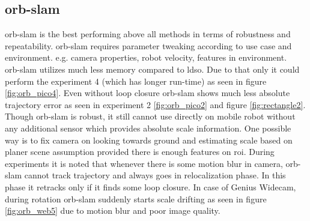 \subsection{\acrshort{orb}-\acrshort{slam}}
\acrshort{orb}-\acrshort{slam} is the best performing above all methods in terms of robustness and repeatability. \acrshort{orb}-\acrshort{slam} requires parameter tweaking according to use case and environment. e.g. camera properties, robot velocity, features in environment.\\
\newline  \acrshort{orb}-\acrshort{slam} utilizes much less memory compared to \acrshort{ldso}. Due to that only it could perform the experiment 4 (which has longer run-time) as seen in figure \ref{fig:orb_pico4}. Even without loop closure \acrshort{orb}-\acrshort{slam} shows much less absolute trajectory error as seen in experiment 2 \ref{fig:orb_pico2} and figure \ref{fig:rectangle2}.\\
\newline Though \acrshort{orb}-\acrshort{slam} is robust, it still cannot use directly on mobile robot without any additional sensor which provides absolute scale information. One possible way is to fix camera on looking towards ground and estimating scale based on planer scene assumption provided there is enough features on \acrshort{roi}. During experiments it is noted that whenever there is some motion blur in camera, \acrshort{orb}-\acrshort{slam} cannot track trajectory and always goes in relocalization phase. In this phase it retracks only if it finds some loop closure. In case of Genius Widecam, during rotation \acrshort{orb}-\acrshort{slam} suddenly starts scale drifting as seen in figure \ref{fig:orb_web5} due to motion blur and poor image quality.

